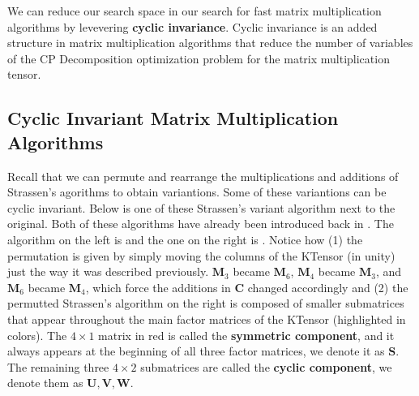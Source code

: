 
We can reduce our search space in our search for fast matrix multiplication
algorithms by levevering \textbf{cyclic invariance}. Cyclic invariance is an
added structure in matrix multiplication algorithms that reduce the number of
variables of the CP Decomposition optimization problem for the matrix
multiplication tensor. 

\subsection{Cyclic Invariant Matrix Multiplication Algorithms} \label{sec:Cyclic Invariant Matrix Multiplication Algorithms} 
    
    Recall that we can permute and rearrange the multiplications and additions
    of Strassen's agorithms to obtain variantions. Some of these variantions can
    be cyclic invariant. Below is one of these Strassen's variant algorithm next
    to the original. Both of these algorithms have already been introduced back
    in . The algorithm on the
    left is  and the one on the right is
    . Notice how (1) the permutation is given by simply
    moving the columns of the KTensor (in unity) just the way it was described
    previously. $\mathbf M_3$ became $\mathbf M_6$, $\mathbf M_4$ became
    $\mathbf M_3$, and $\mathbf M_6$ became $\mathbf M_4$, which force the
    additions in $\mathbf C$ changed accordingly and (2) the permutted
    Strassen's algorithm on the right is composed of smaller submatrices that
    appear throughout the main factor matrices of the KTensor (highlighted in
    colors). The $4\times 1$ matrix in red is called the \textbf{symmetric
    component}, and it always appears at the beginning of all three factor
    matrices, we denote it as $\mathbf{S}$. The remaining three $4\times 2$
    submatrices are called the \textbf{cyclic component}, we denote them as
    $\mathbf{U, V, W}$. 

